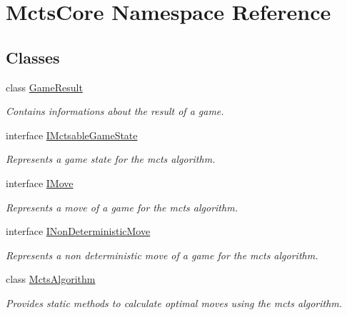 \hypertarget{namespace_mcts_core}{}\section{Mcts\+Core Namespace Reference}
\label{namespace_mcts_core}
\subsection*{Classes}
\begin{DoxyCompactItemize}
\item 
class \mbox{\hyperlink{class_mcts_core_1_1_game_result}{Game\+Result}}
\begin{DoxyCompactList}\small\item\em Contains informations about the result of a game. \end{DoxyCompactList}\item 
interface \mbox{\hyperlink{interface_mcts_core_1_1_i_mctsable_game_state}{I\+Mctsable\+Game\+State}}
\begin{DoxyCompactList}\small\item\em Represents a game state for the mcts algorithm. \end{DoxyCompactList}\item 
interface \mbox{\hyperlink{interface_mcts_core_1_1_i_move}{I\+Move}}
\begin{DoxyCompactList}\small\item\em Represents a move of a game for the mcts algorithm. \end{DoxyCompactList}\item 
interface \mbox{\hyperlink{interface_mcts_core_1_1_i_non_deterministic_move}{I\+Non\+Deterministic\+Move}}
\begin{DoxyCompactList}\small\item\em Represents a non deterministic move of a game for the mcts algorithm. \end{DoxyCompactList}\item 
class \mbox{\hyperlink{class_mcts_core_1_1_mcts_algorithm}{Mcts\+Algorithm}}
\begin{DoxyCompactList}\small\item\em Provides static methods to calculate optimal moves using the mcts algorithm. \end{DoxyCompactList}\end{DoxyCompactItemize}
